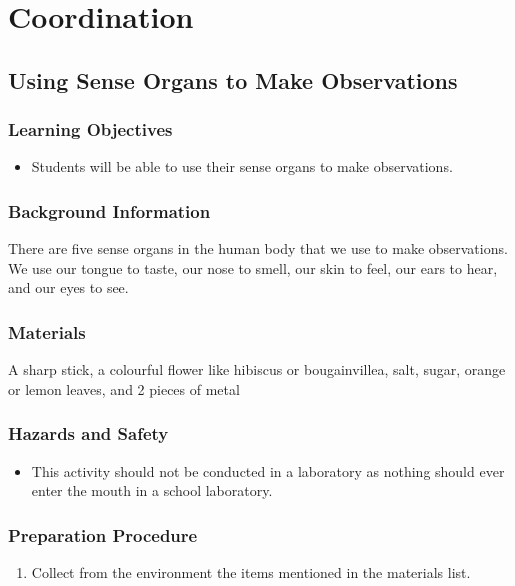 \section{Coordination}
\subsection{Using Sense Organs to Make Observations}
\subsubsection*{Learning Objectives}
\begin{itemize}
\item{Students will be able to use their sense organs to make observations.}
\end{itemize}

\subsubsection*{Background Information}
There are five sense organs in the human body that we use to make observations. We use our tongue to taste, our nose to smell, our skin to feel, our ears to hear, and our eyes to see.

\subsubsection*{Materials}
A sharp stick, a colourful flower like hibiscus or bougainvillea, salt, sugar, orange or lemon leaves, and 2 pieces of metal

\subsubsection*{Hazards and Safety}
\begin{itemize}
\item{This activity should not be conducted in a laboratory as nothing should ever enter the mouth in a school laboratory.}
\end{itemize}

\subsubsection*{Preparation Procedure}
\begin{enumerate}
\item{Collect from the environment the items mentioned in the materials list.}
\end{enumerate}

